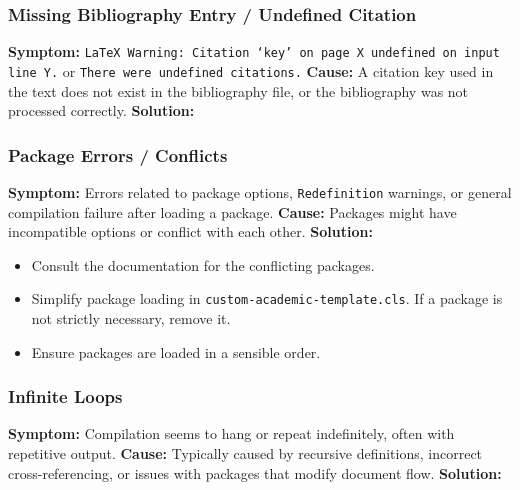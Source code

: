 \documentclass{custom-academic-template}
\begin{document}
\subsubsection{Missing Bibliography Entry / Undefined Citation}
    	\textbf{Symptom:} 	\texttt{LaTeX Warning: Citation `key' on page X undefined on input line Y.} or 	\texttt{There were undefined citations.}
    	\textbf{Cause:} A citation key used in the text does not exist in the bibliography file, or the bibliography was not processed correctly.
    	\textbf{Solution:}

\subsubsection{Package Errors / Conflicts}
    	\textbf{Symptom:} Errors related to package options, 	\texttt{Redefinition} warnings, or general compilation failure after loading a package.
    	\textbf{Cause:} Packages might have incompatible options or conflict with each other.
    	\textbf{Solution:}
    \begin{itemize}
        \item Consult the documentation for the conflicting packages.
        \item Simplify package loading in 	\texttt{custom-academic-template.cls}. If a package is not strictly necessary, remove it.
        \item Ensure packages are loaded in a sensible order.
    \end{itemize}

\subsubsection{Infinite Loops}
    	\textbf{Symptom:} Compilation seems to hang or repeat indefinitely, often with repetitive output.
    	\textbf{Cause:} Typically caused by recursive definitions, incorrect cross-referencing, or issues with packages that modify document flow.
    	\textbf{Solution:}
\end{document}
